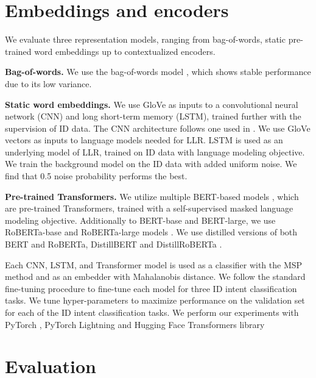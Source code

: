 \documentclass[letterpaper, final]{article} %
\begin{document}
\section{Embeddings and encoders}

We evaluate three representation models, ranging from bag-of-words, static pre-trained word embeddings up to contextualized encoders. 

{\bf Bag-of-words.} We use the bag-of-words model \cite{haris_bow}, which shows stable performance due to its low variance.

{\bf Static word embeddings.} We use GloVe \cite{pennington2014glove} as inputs to a convolutional neural network (CNN) and long short-term memory (LSTM), trained further with the supervision of ID data. The CNN architecture follows one used in \cite{zheng2020out}.  We use GloVe vectors as inputs to language models needed for LLR. LSTM is used as an underlying model of LLR, trained on ID data with language modeling objective. We train the background model on the ID data with added uniform noise. We find that 0.5 noise probability performs the best. 

{\bf Pre-trained Transformers.} We utilize multiple BERT-based models \cite{devlin2019bert}, which are pre-trained Transformers, trained with a self-supervised masked language modeling objective. Additionally to BERT-base and BERT-large, we use RoBERTa-base and RoBERTa-large models \cite{liu2019roberta}. We use distilled versions of both BERT and RoBERTa, DistillBERT and DistillRoBERTa \cite{sanh2019distilbert}. 


Each CNN, LSTM, and Transformer model is used as a classifier with the MSP method and as an embedder with Mahalanobis distance. We follow the standard fine-tuning procedure to fine-tune each model for three ID intent classification tasks.  We tune hyper-parameters to maximize performance on the validation set for each of the ID intent classification tasks. We perform our experiments with PyTorch \cite{paszke2019pytorch}, PyTorch Lightning \cite{falcon2019pytorch} and Hugging Face Transformers library \cite{wolf2019huggingface}

 
\section{Evaluation}
\end{document}

